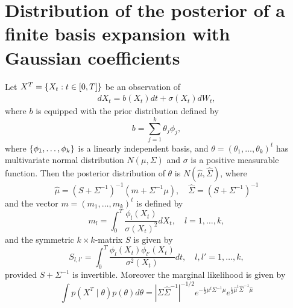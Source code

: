 \documentclass[12pt]{article}
\begin{document}
\section{Distribution of the posterior of a finite basis expansion with Gaussian coefficients}

\begin{lemma}
	Let \(X^T=\left\{ X_t:t\in[0,T] \right\}\) be an observation of 
	\begin{align*}
		dX_t=b(X_t)dt+\sigma(X_t)dW_t,
	\end{align*}
	where \(b\) is equipped with the prior distribution defined by 
	\[
	b=\sum_{j=1}^k\theta_j\phi_j,
	\]
	where \(\left\{ \phi_1,\ldots,\phi_k \right\}\) is a linearly independent basis, and \(\theta=(\theta_1,\ldots,\theta_k)^t\) has multivariate normal distribution \(N(\mu,\Sigma)\) and \(\sigma\) is a positive measurable function. Then the  posterior distribution of \(\theta\) is \(N(\hat\mu,\hat\Sigma)\), where \[\hat\mu=(S+\Sigma^{-1})^{-1}(m+\Sigma^{-1}\mu),\quad\hat\Sigma= (S+\Sigma^{-1})^{-1}\] and the vector \(m=(m_1,\ldots,m_k)^t\) is defined by 
	\[
	m_l=\int_0^T\frac{\phi_l(X_t)}{\sigma(X_t)^2}dX_t, \quad l=1,\ldots,k,
	\] 
	and the symmetric \(k\times k\)-matrix \(S\) is given by 
	\[
	S_{l,l'}=\int_0^T\frac{\phi_l(X_t)\phi_{l'}(X_t)}{\sigma^2(X_t)}dt,\quad l,l'=1,\ldots,k,
	\]
	provided \(S+\Sigma^{-1}\) is invertible. 
	Moreover the marginal likelihood is given by 
	\[
\int p(X^T\mid \theta)p(\theta)d\theta=	|\Sigma\hat\Sigma^{-1}|^{-1/2}e^{-\frac12\mu^t\Sigma^{-1}\mu} e^{\frac12\hat\mu^t\hat\Sigma^{-1}\hat\mu}
	\]
	
\end{lemma}
\end{document}
